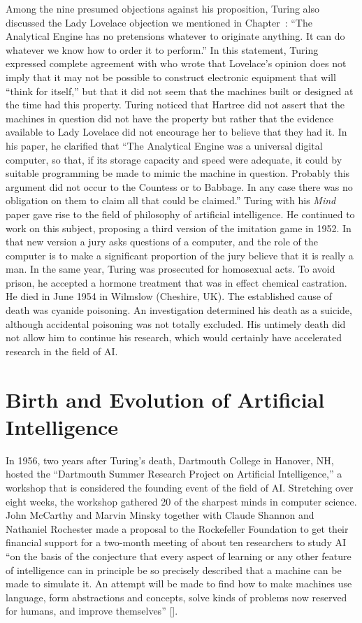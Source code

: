 Among the nine presumed objections against his proposition, Turing also discussed the Lady Lovelace objection we mentioned in Chapter~: ``The Analytical Engine has no pretensions whatever to originate anything. It can do whatever we know how to order it to perform.'' In this statement, Turing expressed complete agreement with \citet{chap:4:Hartree:1949} who wrote that Lovelace's opinion does not imply that it may not be possible to construct electronic equipment that will ``think for itself,'' but that it did not seem that the machines built or designed at the time had this property. Turing noticed that Hartree did not assert that the machines in question did not have the property but rather that the evidence available to Lady Lovelace did not encourage her to believe that they had it. In his paper, he clarified that ``The Analytical Engine was a universal digital computer, so that, if its storage capacity and speed were adequate, it could by suitable programming be made to mimic the machine in question. Probably this argument did not occur to the Countess or to Babbage. In any case there was no obligation on them to claim all that could be claimed.'' Turing with his \textit{Mind} paper gave rise to the field of philosophy of artificial intelligence. He continued to work on this subject, proposing a third version of the imitation game in 1952. In that new version a jury asks questions of a computer, and the role of the computer is to make a significant proportion of the jury believe that it is really a man. In the same year, Turing was prosecuted for homosexual acts. To avoid prison, he accepted a hormone treatment that was in effect chemical castration. He died in June 1954 in Wilmslow (Cheshire, UK). The established cause of death was cyanide poisoning. An investigation determined his death as a suicide, although accidental poisoning was not totally excluded. His untimely death did not allow him to continue his research, which would certainly have accelerated research in the field of AI.

\section{\label{sec:4.2}Birth and Evolution of Artificial Intelligence}

In 1956, two years after Turing's death, Dartmouth College in Hanover, NH, hosted the ``Dartmouth Summer Research Project on Artificial Intelligence,'' a workshop that is considered the founding event of the field of AI. Stretching over eight weeks, the workshop gathered 20 of the sharpest minds in computer science. John McCarthy and Marvin Minsky together with Claude Shannon and Nathaniel Rochester made a proposal to the Rockefeller Foundation to get their financial support for a two-month meeting of about ten researchers to study AI ``on the basis of the conjecture that every aspect of learning or any other feature of intelligence can in principle be so precisely described that a machine can be made to simulate it. An attempt will be made to find how to make machines use language, form abstractions and concepts, solve kinds of problems now reserved for humans, and improve themselves'' [\hbox{\citealt{chap:4:McCarthyetal:1955}}].

